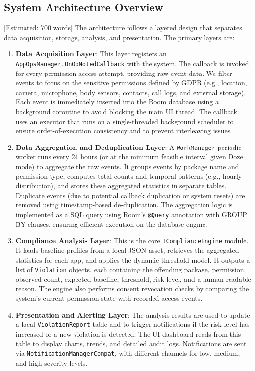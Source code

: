 \subsection{System Architecture Overview} [Estimated: 700 words]
The architecture follows a layered design that separates data acquisition, storage, analysis, and presentation. The primary layers are:

\begin{enumerate}
\item \textbf{Data Acquisition Layer}: This layer registers an \texttt{AppOpsManager.OnOpNotedCallback} with the system. The callback is invoked for every permission access attempt, providing raw event data. We filter events to focus on the sensitive permissions defined by GDPR (e.g., location, camera, microphone, body sensors, contacts, call logs, and external storage). Each event is immediately inserted into the Room database using a background coroutine to avoid blocking the main UI thread. The callback uses an executor that runs on a single-threaded background scheduler to ensure order-of-execution consistency and to prevent interleaving issues.
\item \textbf{Data Aggregation and Deduplication Layer}: A \texttt{WorkManager} periodic worker runs every 24 hours (or at the minimum feasible interval given Doze mode) to aggregate the raw events. It groups events by package name and permission type, computes total counts and temporal patterns (e.g., hourly distribution), and stores these aggregated statistics in separate tables. Duplicate events (due to potential callback duplication or system resets) are removed using timestamp-based de-duplication. The aggregation logic is implemented as a SQL query using Room's \texttt{@Query} annotation with GROUP BY clauses, ensuring efficient execution on the database engine.
\item \textbf{Compliance Analysis Layer}: This is the core \texttt{IComplianceEngine} module. It loads baseline profiles from a local JSON asset, retrieves the aggregated statistics for each app, and applies the dynamic threshold model. It outputs a list of \texttt{Violation} objects, each containing the offending package, permission, observed count, expected baseline, threshold, risk level, and a human-readable reason. The engine also performs consent revocation checks by comparing the system's current permission state with recorded access events.
\item \textbf{Presentation and Alerting Layer}: The analysis results are used to update a local \texttt{ViolationReport} table and to trigger notifications if the risk level has increased or a new violation is detected. The UI dashboard reads from this table to display charts, trends, and detailed audit logs. Notifications are sent via \texttt{NotificationManagerCompat}, with different channels for low, medium, and high severity levels.

\end{enumerate}
